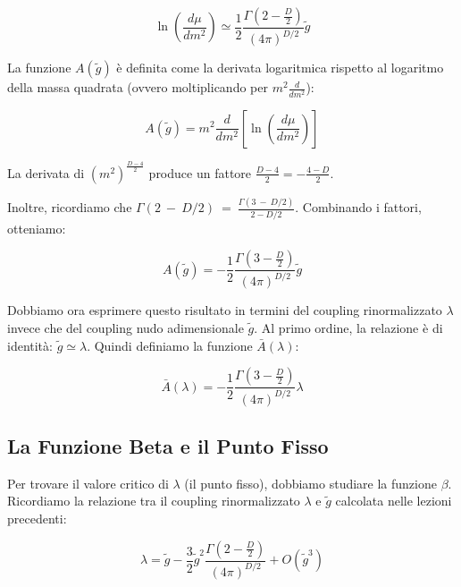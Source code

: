 \begin{equation}
\ln\left(\frac{d\mu}{dm^2}\right) \simeq \frac{1}{2} \frac{\Gamma(2 - \frac{D}{2})}{(4\pi)^{D/2}} \tilde{g}
\end{equation}

\noindent La funzione $A(\tilde{g})$ è definita come la derivata logaritmica rispetto al logaritmo della massa quadrata (ovvero moltiplicando per $m^2 \frac{d}{dm^2}$):

\begin{equation}
A(\tilde{g}) = m^2 \frac{d}{dm^2} \left[ \ln\left(\frac{d\mu}{dm^2}\right) \right]
\end{equation}

\noindent La derivata di $(m^2)^{\frac{D-4}{2}}$ produce un fattore $\frac{D-4}{2} = - \frac{4-D}{2}$.

\noindent Inoltre, ricordiamo che $\Gamma(2~-~D/2)~=~\frac{\Gamma(3~-~D/2)}{2 - D/2}$. Combinando i fattori, otteniamo:

\begin{equation}
A(\tilde{g}) = -\frac{1}{2} \frac{\Gamma(3 - \frac{D}{2})}{(4\pi)^{D/2}} \tilde{g}
\end{equation}


\noindent Dobbiamo ora esprimere questo risultato in termini del coupling rinormalizzato $\lambda$ invece che del coupling nudo adimensionale $\tilde{g}$. Al primo ordine, la relazione è di identità: $\tilde{g} \simeq \lambda$. Quindi definiamo la funzione $\bar{A}(\lambda)$:

\begin{tcolorbox}[colback=colorA!10, colframe=colorB!60!colorA,  title=\textbf{Funzione $\bar{A}(\lambda)$}]
\begin{equation}
\bar{A}(\lambda) = -\frac{1}{2} \frac{\Gamma(3 - \frac{D}{2})}{(4\pi)^{D/2}} \lambda
\end{equation}
\end{tcolorbox}

\subsection{La Funzione Beta e il Punto Fisso}

Per trovare il valore critico di $\lambda$ (il punto fisso), dobbiamo studiare la funzione $\beta$.
Ricordiamo la relazione tra il coupling rinormalizzato $\lambda$ e $\tilde{g}$ calcolata nelle lezioni precedenti:

\begin{equation}
\lambda = \tilde{g} - \frac{3}{2} \tilde{g}^2 \frac{\Gamma(2 - \frac{D}{2})}{(4\pi)^{D/2}} + O(\tilde{g}^3)
\end{equation}

